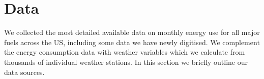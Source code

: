 \documentclass[11pt]{article}
\begin{document}



\section{Data \label{data}}

We collected the most detailed available data on monthly energy use for all major fuels across the US, including some data we have newly digitised. We complement the energy consumption data with weather variables which we calculate from thousands of individual weather stations. In this section we briefly outline our data sources. 
\end{document}
